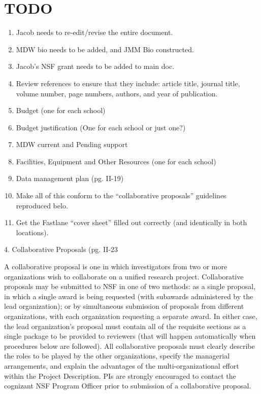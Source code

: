 \documentclass[pdftex,12pt,fullpage,oneside]{amsart}
\begin{document}
\section*{TODO}

\begin{enumerate}
\item Jacob needs to re-edit/revise the entire document.
\item MDW bio needs to be added, and JMM Bio constructed.
\item Jacob's NSF grant needs to be added to main doc.
\item Review references to ensure that they include: article title,
  journal title, volume number, page numbers, authors, and year of
  publication.  
\item Budget (one for each school)
\item Budget justification (One for each school or just one?)
\item MDW current and Pending support
\item Facilities, Equipment and Other Resources (one for each school)
\item Data management plan (pg. II-19)
\item Make all of this conform to the ``collaborative proposals''
  guidelines reproduced belo.
\item Get the Fastlane ``cover sheet'' filled out correctly (and identically in
  both locations).
\end{enumerate}


4. Collaborative Proposals  (pg. II-23

A collaborative proposal is one in which investigators from two or
more organizations wish to collaborate on a unified research project.
Collaborative proposals may be submitted to NSF in one of two methods:
as a single proposal, in which a single award is being requested (with
subawards administered by the lead organization); or by simultaneous
submission of proposals from different organizations, with each
organization requesting a separate award.  In either case, the lead
organization’s proposal must contain all of the requisite sections as
a single package to be provided to reviewers (that will happen
automatically when procedures below are followed).  All collaborative
proposals must clearly describe the roles to be played by the other
organizations, specify the managerial arrangements, and explain the
advantages of the multi-organizational effort within the Project
Description.  PIs are strongly encouraged to contact the cognizant NSF
Program Officer prior to submission of a collaborative proposal.
\end{document}
